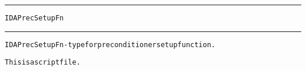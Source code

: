 \begin{samepage}
\hrule
\begin{center}
{\large \verb!IDAPrecSetupFn!}
\label{p:IDAPrecSetupFn}
\end{center}
\hrule\vspace{0.1in}



\begin{alltt}
IDAPrecSetupFn - type for preconditioner setup function.
\end{alltt}

\end{samepage}



\begin{samepage}


\begin{alltt}
This is a script file. 
\end{alltt}

\end{samepage}



